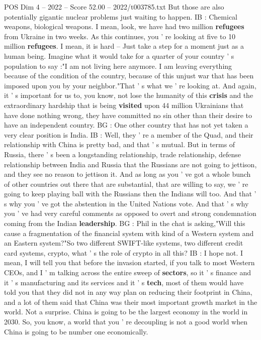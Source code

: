 \begin{textsample}{POS Dim 4 – 2022 – Score 52.00 – 2022/t003785.txt}
But those are also potentially gigantic nuclear problems just waiting to happen.
IB : Chemical weapons, biological weapons.
I mean, look, we have had two million \textbf{refugees} from Ukraine in two weeks.
As this continues, you ' re looking at five to 10 million \textbf{refugees}.
I mean, it is hard -- Just take a step for a moment just as a human being.
Imagine what it would take for a quarter of your country ' s population to say :"I am not living here anymore.
I am leaving everything because of the condition of the country, because of this unjust war that has been imposed upon you by your neighbor."That ' s what we ' re looking at.
And again, it ' s important for us to, you know, not lose the humanity of this \textbf{crisis} and the extraordinary hardship that is being \textbf{visited} upon 44 million Ukrainians that have done nothing wrong, they have committed no sin other than their desire to have an independent country.
BG : One other country that has not yet taken a very clear position is India.
IB : Well, they ' re a member of the Quad, and their relationship with China is pretty bad, and that ' s mutual.
But in terms of Russia, there ' s been a longstanding relationship, trade relationship, defense relationship between India and Russia that the Russians are not going to jettison, and they see no reason to jettison it.
And as long as you ' ve got a whole bunch of other countries out there that are substantial, that are willing to say, we ' re going to keep playing ball with the Russians then the Indians will too.
And that ' s why you ' ve got the abstention in the United Nations vote.
And that ' s why you ' ve had very careful comments as opposed to overt and strong condemnation coming from the Indian \textbf{leadership}.
BG : Phil in the chat is asking,"Will this cause a fragmentation of the financial system with kind of a Western system and an Eastern system?"So two different SWIFT-like systems, two different credit card systems, crypto, what ' s the role of crypto in all this?
IB : I hope not.
I mean, I will tell you that before the invasion started, if you talk to most Western CEOs, and I ' m talking across the entire sweep of \textbf{sectors}, so it ' s finance and it ' s manufacturing and its services and it ' s \textbf{tech}, most of them would have told you that they did not in any way plan on reducing their footprint in China, and a lot of them said that China was their most important growth market in the world.
Not a surprise.
China is going to be the largest economy in the world in 2030.
So, you know, a world that you ' re decoupling is not a good world when China is going to be number one economically.

\end{textsample}
